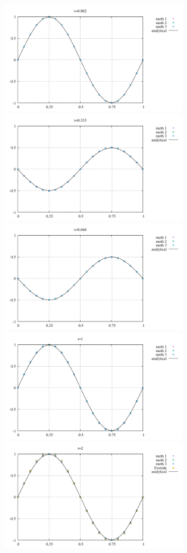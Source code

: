 \begin{center}
\includegraphics[width=8cm]{python_codes/fieldstone_164/results1/u_0.pdf}
\includegraphics[width=8cm]{python_codes/fieldstone_164/results1/u_1.pdf}\\
\includegraphics[width=8cm]{python_codes/fieldstone_164/results1/u_2.pdf}
\includegraphics[width=8cm]{python_codes/fieldstone_164/results1/u_3.pdf}\\
\includegraphics[width=8cm]{python_codes/fieldstone_164/results1/u_4.pdf}

\end{center}
